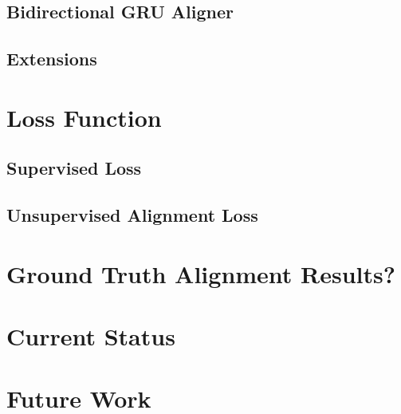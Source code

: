 \documentclass[twoside,twocolumn]{article}
\begin{document}
\subsection{Bidirectional GRU Aligner}
\subsection{Extensions}

\section{Loss Function}
\subsection{Supervised Loss}
\subsection{Unsupervised Alignment Loss}

\section{Ground Truth Alignment Results?}

\section{Current Status}

\section{Future Work}









\clearpage
\appendix
\onecolumn
\end{document}
